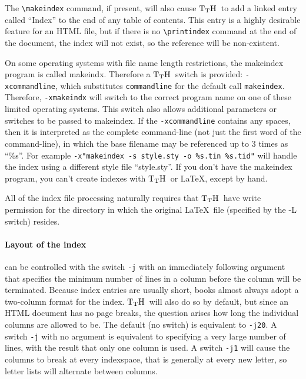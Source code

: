 \documentclass[12pt]{article}
\def\TtH{$\rm{}T_TH$}
\begin{document}
The \verb+\makeindex+ command, if present, will also cause \TtH\ to add
a linked entry called ``Index'' 
to the end of any table of contents. This entry is a highly desirable
feature for an HTML file, but if there is no \verb+\printindex+
command at the end of the document, the index will not exist, so the
reference will be non-existent.

On some operating systems with file name length restrictions, the
makeindex program is called makeindx. Therefore a \TtH\ switch is
provided: \verb+-xcommandline+, which substitutes \verb+commandline+
for the default call \verb+makeindex+. Therefore, \verb+-xmakeindx+
will switch to the correct program name on one of these limited
operating systems. This switch also allows additional parameters or
switches to be passed to makeindex. If the \verb+-xcommandline+
contains any spaces, then it is interpreted as the complete
command-line (not just the first word of the command-line), in which
the base filename may be referenced up to 3 times as ``\%s''. For
example
\verb+-x"makeindex -s style.sty -o %s.tin %s.tid"+ will handle the
index using a different style file ``style.sty''.
If you don't have the makeindex program, you can't create indexes with
\TtH\ or \LaTeX, except by hand.

All of the index file processing naturally requires that \TtH\ have
write permission for the directory in which the original \LaTeX\ file
(specified by the -L switch) resides.

\paragraph{Layout of the index} can be controlled with the switch
\verb!-j! with an immediately following argument that specifies the
minimum number of lines in a column before the column will be
terminated. Because index entries are usually short, books almost
always adopt a two-column format for the index. \TtH\ will also do so
by default, but since an HTML document has no page breaks, the question
arises how long the individual columns are allowed to be. The default
(no switch) is equivalent to \verb!-j20!. A switch \verb!-j! with no
argument is equivalent to specifying a very large number of lines,
with the result that only one column is used.  A switch \verb!-j1!
will cause the columns to break at every indexspace, that is generally
at every new letter, so letter lists will alternate between columns.
\end{document}
